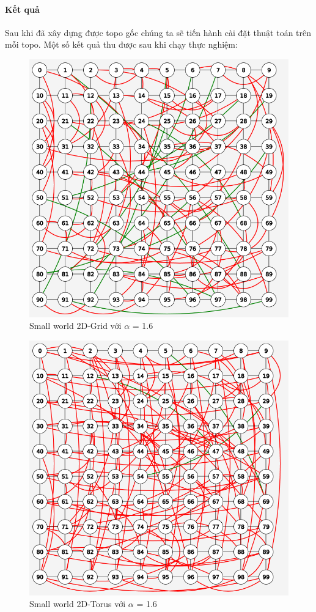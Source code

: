 \documentclass[../report.tex]{subfiles}
\begin{document}
\paragraph*{Kết quả}
Sau khi đã xây dựng được topo gốc chúng ta sẽ tiến hành cài đặt thuật toán trên mỗi topo. Một số kết quả thu được sau khi chạy thực nghiệm:

\begin{figure}[H]
    \centering
    \includegraphics[scale=0.55]{figures/grid16.png}
    \caption{Small world 2D-Grid với $\alpha$ = 1.6}
\end{figure}

\begin{figure}[H]
    \centering
    \includegraphics[scale=0.55]{figures/torus16.png}
    \caption{Small world 2D-Torus với $\alpha$ = 1.6}
\end{figure}
\end{document}
